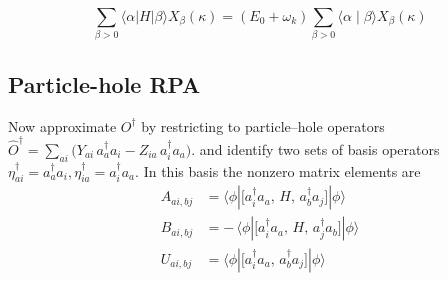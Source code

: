 \begin{equation}
\sum_{\beta>0}\langle\alpha| H|\beta\rangle X_\beta(\kappa)=\left(E_0+\omega_k\right) \sum_{\beta>0}\langle\alpha \mid \beta\rangle X_\beta(\kappa)
\end{equation}
\subsection{Particle-hole RPA}
\noindent Now approximate \(O^\dagger\) by restricting to particle–hole operators $
\hat O^\dagger
=\sum_{a i}\bigl(Y_{a i}\,a_a^\dagger a_i - Z_{i a}\,a_i^\dagger a_a\bigr).$ and identify two sets of basis operators $
\eta_{a i}^\dagger = a_a^\dagger a_i,
\eta_{i a}^\dagger = a_i^\dagger a_a.$
In this basis the nonzero matrix elements are
\begin{align}
A_{ai,bj}
&=\langle\phi|\bigl[a_i^\dagger a_a,\,H,\,a_b^\dagger a_j\bigr]|\phi\rangle\\
B_{ai,bj}
&=-\,\langle\phi|\bigl[a_i^\dagger a_a,\,H,\,a_j^\dagger a_b\bigr]|\phi\rangle \\
U_{ai,bj}
&=\langle\phi|\bigl[a_i^\dagger a_a,\,a_b^\dagger a_j\bigr]|\phi\rangle
\end{align}

\medskip


